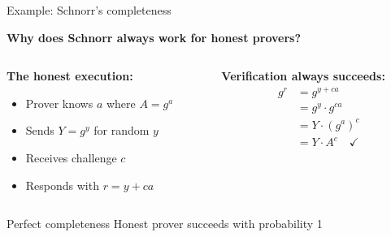 \documentclass[aspectratio=169, lualatex, handout]{beamer}
\begin{document}
\begin{frame}{Example: Schnorr's completeness}
	\begin{center}
		\textbf{Why does Schnorr always work for honest provers?}
	\end{center}
	\vspace{0.5em}
	\begin{columns}[c]
		\begin{column}{0.5\textwidth}
			\textbf{The honest execution:}
			\begin{itemize}
				\item Prover knows $a$ where $A = g^a$
				\item Sends $Y = g^y$ for random $y$
				\item Receives challenge $c$
				\item Responds with $r = y + ca$
			\end{itemize}
		\end{column}
		\begin{column}{0.5\textwidth}
			\textbf{Verification always succeeds:}
			\begin{align*}
				g^r & = g^{y + ca}                   \\
				    & = g^y \cdot g^{ca}             \\
				    & = Y \cdot (g^a)^c              \\
				    & = Y \cdot A^c \quad \checkmark
			\end{align*}
		\end{column}
	\end{columns}
	\vspace{0.5em}
	\begin{exampleblock}{Perfect completeness}
		Honest prover succeeds with probability 1
	\end{exampleblock}
\end{frame}
\end{document}
